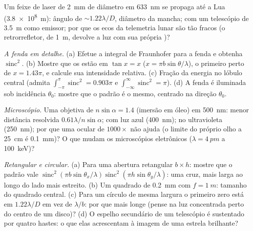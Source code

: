 \begin{exercise}[$\star$]\label{exo:b2:diffraction:4}
Um feixe de laser de \qty{2}{mm} de diâmetro em \qty{633}{nm} se propaga até a Lua
(\qty{3.8e8}{m}): ângulo de  $\sim1.22\lambda/D$, diâmetro da mancha;
com um telescópio de \qty{3.5}{m} como emissor; por que os ecos da telemetria lunar são tão
fracos (o retrorrefletor, de \qty{1}{m}, devolve a luz com sua própria
)?
\end{exercise}

\begin{exercise}[$\star\star$]\label{exo:b2:diffraction:5}
\emph{A fenda em detalhe.} (a) Efetue a integral de Fraunhofer para
a fenda e obtenha $\operatorname{sinc}^2$. (b) Mostre que os 
estão em $\tan x = x$ ($x = \pi b\sin\theta/\lambda$), o primeiro perto de $x = 1.43\pi$, e
calcule sua intensidade relativa. (c) Fração da energia no
lóbulo central (admita $\int_{-\pi}^\pi\operatorname{sinc}^2 = 0.903\pi$ e
$\int_{-\infty}^\infty\operatorname{sinc}^2 = \pi$). (d) A fenda é iluminada sob incidência
$\theta_0$: mostre que o padrão é o mesmo, centrado na direção $\theta_0$.
\end{exercise}

\begin{exercise}[$\star\star$]\label{exo:b2:diffraction:6}
\emph{Microscópio.} Uma objetiva de  $n\sin\alpha = 1.4$
(imersão em óleo) em \qty{500}{nm}: menor distância resolvida $0.61\lambda/n\sin
\alpha$; com luz azul (\qty{400}{nm}); no ultravioleta (\qty{250}{nm}); por que
uma ocular de $1000\times$ não ajuda (o limite do próprio olho a \qty{25}{cm} é
\qty{0.1}{mm})? O que mudam os microscópios eletrônicos ($\lambda = \qty{4}{pm}$ a
\qty{100}{keV})?
\end{exercise}

\begin{exercise}[$\star\star$]\label{exo:b2:diffraction:7}
\emph{Retangular e circular.} (a) Para uma abertura retangular $b \times h$:
mostre que o padrão vale $\operatorname{sinc}^2(\pi b\sin\theta_x/\lambda)\operatorname{sinc}^2(\pi h
\sin\theta_y/\lambda)$: uma cruz, mais larga ao longo do lado mais estreito. (b) Um quadrado de
\qty{0.2}{mm} com $f = \qty{1}{m}$: tamanho do quadrado central. (c) Para um
círculo de mesma largura o primeiro zero está em $1.22\lambda/D$ em vez de $\lambda/b$:
por que mais longe (pense na luz concentrada perto do centro de um
disco)? (d) O espelho secundário de um telescópio é sustentado por quatro hastes: o que
elas acrescentam à imagem de uma estrela brilhante?
\end{exercise}

